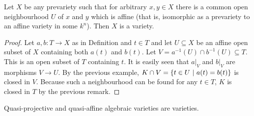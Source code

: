 \documentclass[a4paper,parskip=half,numbers=enddot, DIV=12]{scrreprt}
\begin{document}
\begin{prop}
    Let $X$ be any prevariety such that for arbitrary $x,y\in X$ there is a common open neighbourhood $U$ of $x$ and $y$ which is affine (that is, isomorphic as a prevariety to an affine variety in some $k^n$). Then $X$ is a variety.
\end{prop}
\begin{proof}
    Let $a,b\colon T\to X$ as in Definition  and $t\in T$ and let $U\subseteq X$ be an affine open subset of $X$ containing both $a(t)$ and $b(t)$. Let $V = a^{-1}(U) \cap b^{-1}(U)\subseteq T$. This is an open subset of $T$ containing $t$. It is easily seen that $a|_V$ and $b|_V$ are morphisms $V\to U$. By the previous example, $K\cap V = \left\{t\in U\ \middle|\  a(t) = b(t)\right\}$ is closed in $V$. Because such a neighbourhood can be found for any $t\in T$, $K$ is closed in $T$ by the previous remark.
\end{proof}
\begin{cor}
    Quasi-projective and quasi-affine algebraic varieties are varieties.
\end{cor}
\end{document}
